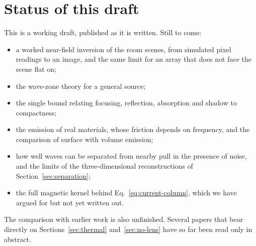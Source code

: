 \section{Status of this draft}\label{sec:status}

This is a working draft, published as it is written. Still to come:
\begin{itemize}
\item a worked near-field inversion of the room scenes, from simulated pixel
readings to an image, and the same limit for an array that does not face the
scene flat on;
\item the wave-zone theory for a general source;
\item the single bound relating focusing, reflection, absorption and shadow to
compactness;
\item the emission of real materials, whose friction depends on frequency,
and the comparison of surface with volume emission;
\item how well waves can be separated from nearby pull in the presence of
noise, and the limits of the three-dimensional reconstructions of
Section~\ref{sec:separation};
\item the full magnetic kernel behind Eq.~\eqref{eq:current-column}, which we
have argued for but not yet written out.
\end{itemize}
The comparison with earlier work is also unfinished. Several papers that bear
directly on Sections~\ref{sec:thermal} and~\ref{sec:no-lens} have so far been
read only in abstract.
